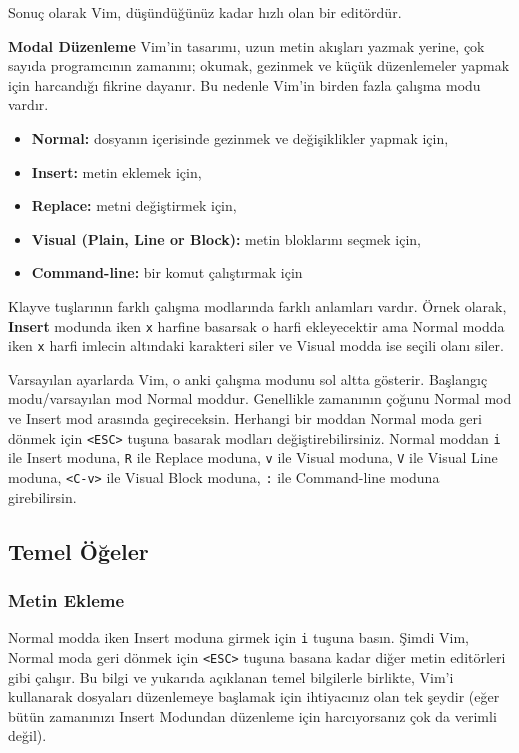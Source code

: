\documentclass[
]{book}
\providecommand{\tightlist}{%
  \setlength{\itemsep}{0pt}\setlength{\parskip}{0pt}}
\begin{document}
Sonuç olarak Vim, düşündüğünüz kadar hızlı olan bir editördür.

\textbf{Modal Düzenleme}
Vim'in tasarımı, uzun metin akışları yazmak yerine, çok sayıda programcının zamanını; okumak, gezinmek ve küçük düzenlemeler yapmak için harcandığı fikrine dayanır. Bu nedenle Vim'in birden fazla çalışma modu vardır.

\begin{itemize}
\tightlist
\item
  \textbf{Normal:} dosyanın içerisinde gezinmek ve değişiklikler yapmak için,
\item
  \textbf{Insert:} metin eklemek için,
\item
  \textbf{Replace:} metni değiştirmek için,
\item
  \textbf{Visual (Plain, Line or Block):} metin bloklarını seçmek için,
\item
  \textbf{Command-line:} bir komut çalıştırmak için
\end{itemize}

Klayve tuşlarının farklı çalışma modlarında farklı anlamları vardır. Örnek olarak, \textbf{Insert} modunda iken \texttt{x} harfine basarsak o harfi ekleyecektir ama Normal modda iken \texttt{x} harfi imlecin altındaki karakteri siler ve Visual modda ise seçili olanı siler.

Varsayılan ayarlarda Vim, o anki çalışma modunu sol altta gösterir. Başlangıç modu/varsayılan mod Normal moddur. Genellikle zamanının çoğunu Normal mod ve Insert mod arasında geçireceksin. Herhangi bir moddan Normal moda geri dönmek için \texttt{\textless{}ESC\textgreater{}} tuşuna basarak modları değiştirebilirsiniz. Normal moddan \texttt{i} ile Insert moduna, \texttt{R} ile Replace moduna, \texttt{v} ile Visual moduna, \texttt{V} ile Visual Line moduna, \texttt{\textless{}C-v\textgreater{}} ile Visual Block moduna, \texttt{:} ile Command-line moduna girebilirsin.

\hypertarget{temel-uxf6ux11feler}{%
\subsection{Temel Öğeler}\label{temel-uxf6ux11feler}}

\hypertarget{metin-ekleme}{%
\subsubsection{Metin Ekleme}\label{metin-ekleme}}

Normal modda iken Insert moduna girmek için \texttt{i} tuşuna basın. Şimdi Vim, Normal moda geri dönmek için \texttt{\textless{}ESC\textgreater{}} tuşuna basana kadar diğer metin editörleri gibi çalışır. Bu bilgi ve yukarıda açıklanan temel bilgilerle birlikte, Vim'i kullanarak dosyaları düzenlemeye başlamak için ihtiyacınız olan tek şeydir (eğer bütün zamanınızı Insert Modundan düzenleme için harcıyorsanız çok da verimli değil).
\end{document}
